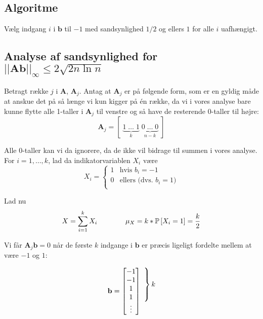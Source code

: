 \subsection{Algoritme}
Vælg indgang $i$ i $\mathbf b$ til $-1$ med sandsynlighed $1/2$ og ellers $1$ for alle $i$ uafhængigt.






\subsection{Analyse af sandsynlighed for $||\mathbf{Ab}||_\infty \leq 2 \sqrt{2 n \ln n}$}
Betragt række $j$ i $\mathbf A$, $\mathbf A_j$. Antag at $\mathbf A_j$ er på følgende form, som er en gyldig måde at anskue det på så længe vi kun kigger på én række, da vi i vores analyse bare kunne flytte alle 1-taller i $\mathbf A_j$ til venstre og så have de resterende 0-taller til højre:
$$
\mathbf A_j = [ \; \underbrace{1 \; \dots \; 1}_{k} \; \underbrace{0 \; \dots \; 0}_{n-k} \; ]
$$

Alle 0-taller kan vi da ignorere, da de ikke vil bidrage til summen i vores analyse.\\
For $i = 1, \dots, k$, lad da indikatorvariablen $X_i$ være
$$
X_i
=
\begin{cases}
	1 & \text{hvis $b_i = -1$}\\
	0 & \text{ellers (dvs. $b_i = 1$)}\\
\end{cases}
$$

Lad nu
$$
X = \sum_{i=1}^k X_i \quad\quad\quad\quad \mu_X = k * \P{X_i = 1} = \frac{k}{2}
$$


Vi får $\mathbf A_j \mathbf b = 0$ når de første $k$ indgange i $\mathbf b$ er præcis ligeligt fordelte mellem at være $-1$ og $1$:

\[
  \setlength{\arraycolsep}{0pt}
  \mathbf{b} =
    \left[
      \begin{array}{c}
        \begin{array}{c}
          -1 \\ -1 \\ 1 \\ 1
        \end{array} \\
        \begin{array}{c}
          \vdots
        \end{array}
      \end{array}
    \right]
  ~ %
  \begin{array}{c}
    \noleftdelimiter
    \vphantom{\begin{array}{c}
      -1 \\ -1 \\ 1 \\ 1
    \end{array}}
    \right\} k \\
    \vphantom{\begin{array}{c}
      \vdots
    \end{array}}
  \end{array}
\]


